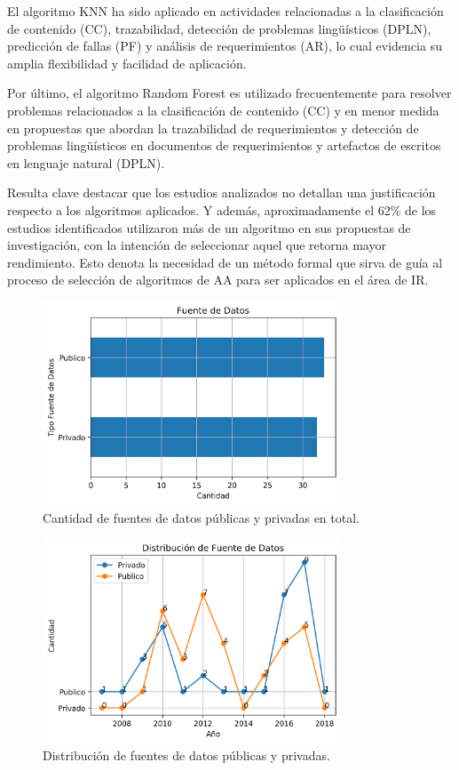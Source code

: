 \documentclass[journal]{IEEEtran}
\begin{document}
El algoritmo KNN ha sido aplicado en actividades relacionadas a la clasificación de contenido (CC), trazabilidad, detección de problemas lingüísticos (DPLN), predicción de fallas (PF) y análisis de requerimientos (AR), lo cual evidencia su amplia flexibilidad y facilidad de aplicación.

Por último, el algoritmo Random Forest es utilizado frecuentemente para resolver problemas relacionados a la clasificación de contenido (CC) y en menor medida en propuestas que abordan la trazabilidad de requerimientos y detección de problemas lingüísticos en documentos de requerimientos y artefactos de escritos en lenguaje natural (DPLN). 

Resulta clave destacar que los estudios analizados no detallan una justificación respecto a los algoritmos aplicados. Y además, aproximadamente el 62\% de los estudios identificados utilizaron más de un algoritmo en sus propuestas de investigación, con la intención de seleccionar aquel que retorna mayor rendimiento. Esto denota la necesidad de un método formal que sirva de guía al proceso de selección de algoritmos de AA para ser aplicados en el área de IR.

\begin{figure}[!t]
\centering
\includegraphics[width=3.5in]{figures/Figure10_Guada.png}
\caption{Cantidad de fuentes de datos públicas y privadas en total.}
\label{fig:11}
\end{figure}

\begin{figure}[!t]
\centering
\includegraphics[width=3.5in]{figures/Figure12_Guada.png}
\caption{Distribución de fuentes de datos públicas y privadas.}
\label{fig:12}
\end{figure}
\end{document}
